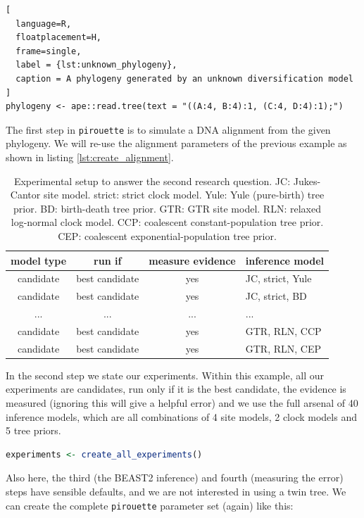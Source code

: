 \documentclass{article}
\begin{document}
\begin{lstlisting}[
  language=R, 
  floatplacement=H, 
  frame=single, 
  label = {lst:unknown_phylogeny},
  caption = A phylogeny generated by an unknown diversification model
]
phylogeny <- ape::read.tree(text = "((A:4, B:4):1, (C:4, D:4):1);")
\end{lstlisting}

The first step in \verb;pirouette; is to simulate a DNA alignment from the given phylogeny. We will re-use the alignment parameters of the previous example as shown in listing \ref{lst:create_alignment}.

\begin{table}
  \begin{tabular}{ | c | c | c | l | }
    \hline
    \textbf{model type} & \textbf{run if} & \textbf{measure evidence} & \textbf{inference model} \\ 
    \hline
    candidate & best candidate & yes & JC, strict, Yule \\
    candidate & best candidate & yes & JC, strict, BD \\
    ...       & ...            & ... & ... \\
    candidate & best candidate & yes & GTR, RLN, CCP \\
    candidate & best candidate & yes & GTR, RLN, CEP \\
    \hline
  \end{tabular}
  \caption{
    Experimental setup to answer the second research question.
    JC: Jukes-Cantor site model.
    strict: strict clock model.
    Yule: Yule (pure-birth) tree prior.
    BD: birth-death tree prior.
    GTR: GTR site model.
    RLN: relaxed log-normal clock model.
    CCP: coalescent constant-population tree prior.
    CEP: coalescent exponential-population tree prior.
  }
\end{table}

In the second step we state our experiments. 
Within this example, all our experiments are candidates,
run only if it is the best candidate, the evidence is measured (ignoring
this will give a helpful error) and we use the full arsenal of 
40 inference models, which are all combinations of 4 site 
models, 2 clock models and 5 tree priors.

\begin{lstlisting}[language=R, floatplacement=H, frame=single]
experiments <- create_all_experiments()
\end{lstlisting}

Also here, the third (the BEAST2 inference) and fourth (measuring the error)
steps have sensible defaults, and we are not
interested in using a twin tree. We can create the complete
\verb;pirouette; parameter set (again) like this:
\end{document}
